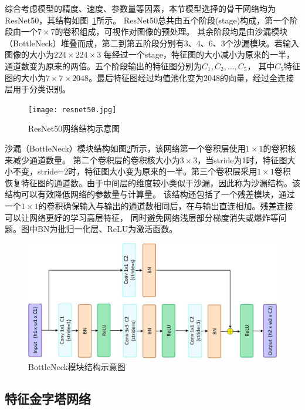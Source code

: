 综合考虑模型的精度、速度、参数量等因素，本节模型选择的骨干网络均为ResNet50，其结构如图~\ref{fig:resnet50}所示。
ResNet50总共由五个阶段(stage)构成，第一个阶段由一个$7\times7$的卷积组成，可视作对图像的预处理。
其余阶段均是由沙漏模块（BottleNeck）堆叠而成，第二到第五阶段分别有3、4、6、3个沙漏模块。若输入图像的大小为$224\times224\times3$
每经过一个stage，特征图的大小减小为原来的一半，通道数变为原来的两倍。五个阶段输出的特征图分别为$C_1, C_2, \dots, C_5$，
其中$C_5$特征图的大小为$7\times7\times2048$。最后特征图经过均值池化变为2048的向量，经过全连接层用于分类识别。

\begin{figure}[htbp]      
  \centering       
  \texttt{[image: resnet50.jpg]}       
  \caption{ResNet50网络结构示意图}       
  \label{fig:resnet50}  
\end{figure}   

沙漏（BottleNeck）模块结构如图\ref{fig:bottleneck}所示，该网络第一个卷积层使用$1\times1$的卷积核来减少通道数量。
第二个卷积层的卷积核大小为$3\times3$，当stride为1时，特征图大小不变，stride=2时，特征图大小变为原来的一半。第三个卷积层采用$1\times1$卷积
恢复特征图的通道数。由于中间层的维度较小类似于沙漏，因此称为沙漏结构。该结构可以有效降低网络的参数量与计算量。
该结构还包括了一个残差模块，通过一个$1\times1$的卷积确保输入与输出的通道数相同后，在与输出直连相加。残差连接可以让网络更好的学习高层特征，
同时避免网络浅层部分梯度消失或爆炸等问题。图中BN为批归一化层、ReLU为激活函数。

\begin{figure}[htbp]        
  \centering          
  \includegraphics[width=0.7\linewidth]{bottleneck.jpg}          
  \caption{BottleNeck模块结构示意图}          
  \label{fig:bottleneck}   
\end{figure}    

\subsection{特征金字塔网络}

